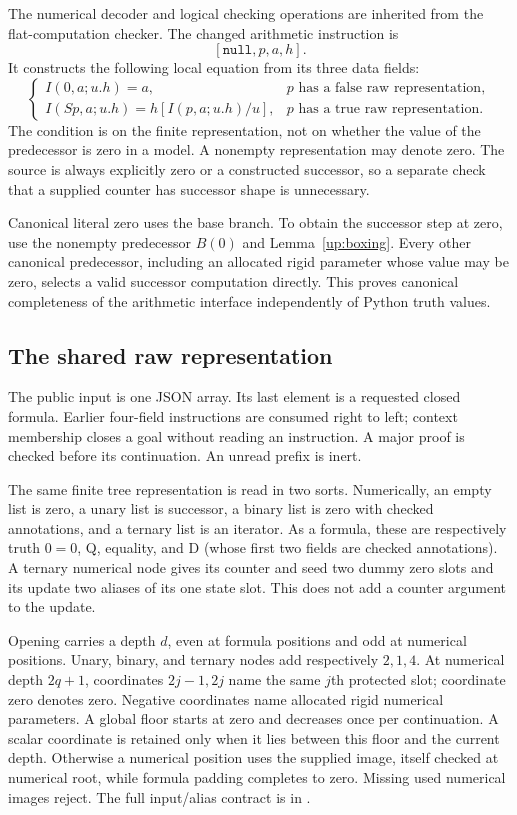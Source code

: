 The numerical decoder and logical checking operations are inherited from
the flat-computation checker. The changed arithmetic instruction is
\[
                    [\mathtt{null},p,a,h].
\]
It constructs the following local equation from its three data fields:
\[
 \begin{cases}
 I(0,a;u.h)=a,&p\text{ has a false raw representation},\\
 I(Sp,a;u.h)=h[I(p,a;u.h)/u],&p\text{ has a true raw representation}.
 \end{cases}
\]
The condition is on the finite representation, not on whether the value
of the predecessor is zero in a model. A nonempty representation may
denote zero. The source is always explicitly zero or a constructed
successor, so a separate check that a supplied counter has successor
shape is unnecessary.

Canonical literal zero uses the base branch. To obtain the successor step
at zero, use the nonempty predecessor $B(0)$ and
Lemma~\ref{up:boxing}. Every other canonical predecessor, including an
allocated rigid parameter whose value may be zero, selects a valid
successor computation directly. This proves canonical completeness of
the arithmetic interface independently of Python truth values.

\subsection{The shared raw representation}

The public input is one JSON array. Its last element is a requested closed
formula. Earlier four-field instructions are consumed right to left;
context membership closes a goal without reading an instruction. A major
proof is checked before its continuation. An unread prefix is inert.

The same finite tree representation is read in two sorts. Numerically,
an empty list is zero, a unary list is successor, a binary list is zero
with checked annotations, and a ternary list is an iterator. As a formula,
these are respectively truth $0=0$, Q, equality, and D (whose first two
fields are checked annotations). A ternary numerical node gives its
counter and seed two dummy zero slots and its update two aliases of its
one state slot. This does not add a counter argument to the update.

Opening carries a depth $d$, even at formula positions and odd at
numerical positions. Unary, binary, and ternary nodes add respectively
$2,1,4$. At numerical depth $2q+1$, coordinates $2j-1,2j$ name the same
$j$th protected slot; coordinate zero denotes zero. Negative coordinates
name allocated rigid numerical parameters. A global floor starts at zero
and decreases once per continuation. A scalar coordinate is retained only
when it lies between this floor and the current depth. Otherwise a
numerical position uses the supplied image, itself checked at numerical
root, while formula padding completes to zero. Missing used numerical
images reject. The full input/alias contract is in .

